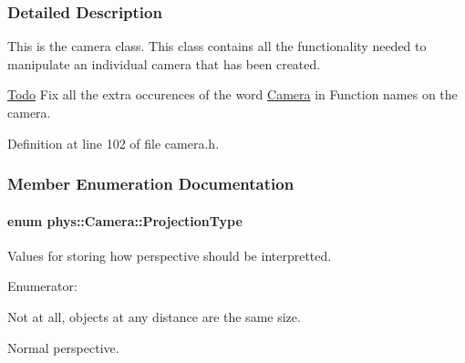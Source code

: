 \subsubsection{Detailed Description}
This is the camera class. This class contains all the functionality needed to manipulate an individual camera that has been created. \begin{Desc}
\item[\hyperlink{todo__todo000002}{Todo}]Fix all the extra occurences of the word \hyperlink{classphys_1_1Camera}{Camera} in Function names on the camera. \end{Desc}


Definition at line 102 of file camera.h.



\subsubsection{Member Enumeration Documentation}
\hypertarget{classphys_1_1Camera_a87d8d46e9eb2080b10712079be69d86a}{
\paragraph[{ProjectionType}]{\setlength{\rightskip}{0pt plus 5cm}enum {\bf phys::Camera::ProjectionType}}\hfill}
\label{classphys_1_1Camera_a87d8d46e9eb2080b10712079be69d86a}


Values for storing how perspective should be interpretted. 

\begin{Desc}
\item[Enumerator: ]\par
\begin{description}
\item[{\em 
\hypertarget{classphys_1_1Camera_a87d8d46e9eb2080b10712079be69d86aa6a71e6ab2139c8fc4d48d64aa9717f02}{
Orthographic}
\label{classphys_1_1Camera_a87d8d46e9eb2080b10712079be69d86aa6a71e6ab2139c8fc4d48d64aa9717f02}
}]Not at all, objects at any distance are the same size. \item[{\em 
\hypertarget{classphys_1_1Camera_a87d8d46e9eb2080b10712079be69d86aacfe21986c8c655b8d19ebd76118de055}{
Perspective}
\label{classphys_1_1Camera_a87d8d46e9eb2080b10712079be69d86aacfe21986c8c655b8d19ebd76118de055}
}]Normal perspective. \end{description}
\end{Desc}



